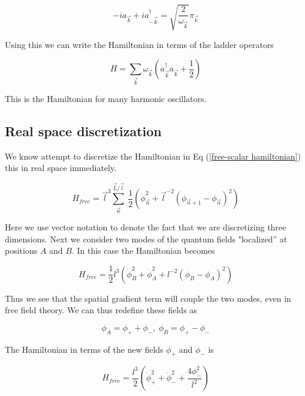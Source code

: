 \documentclass[aps,showpacs,onecolumn,floats,prd,superscriptaddress,nofootinbib]{revtex4-1}
\begin{document}
\begin{equation}
	-ia_{\vec{k}} + i a^\dagger_{- \vec{k}} = \sqrt{\frac{2}{\omega_{\vec{k}}}} \pi_{\vec{k}}
\end{equation}

Using this we can write the Hamiltonian in terms of the ladder operators

\begin{equation}
	H = \sum_{\vec{k}} \omega_{\vec{k}} \left( a^\dagger_{\vec{k}} a_{\vec{k}} + \frac{1}{2} \right)
\end{equation}

This is the Hamiltonian for many harmonic oscillators. 

\subsection{Real space discretization}

We know attempt to discretize the Hamiltonian in Eq (\ref{free-scalar hamiltonian}) this in real space immediately. 

\begin{equation}
	H_{free} = \vec{l}^3 \sum_{\vec{n}}^{\vec{L}/\vec{l}} \ \frac{1}{2} \left( \dot{\phi}^2_{\vec{n}} + \vec{l}^{-2} ( \phi_{\vec{n} + 1} - \phi_{\vec{n}})^2 \right)
\end{equation}

Here we use vector notation to denote the fact that we are discretizing three dimensions.
Next we consider two modes of the quantum fields "localized'' at positions $A$ and $B$. 
In this case the Hamiltonian becomes

\begin{equation}
	H_{free} = \frac{1}{2} l^3 \left( \dot{\phi}^2_B + \dot{\phi}^2_A + l^{-2} (\phi_B - \phi_A)^2 \right)
\end{equation}

Thus we see that the spatial gradient term will couple the two modes, even in free field theory. We can thus redefine these fields as

\begin{equation}
	\phi_A = \phi_+ + \phi_-, \ \phi_B = \phi_+ - \phi_-
\end{equation}

The Hamiltonian in terms of the new fields $\phi_+$ and $\phi_-$ is

\begin{equation}
	H_{free} = \frac{l^3}{2} \left( \dot{\phi}_+^2 + \dot{\phi}_-^2 + \frac{4 \phi_-^2}{l^2} \right)
\end{equation}
\end{document}
